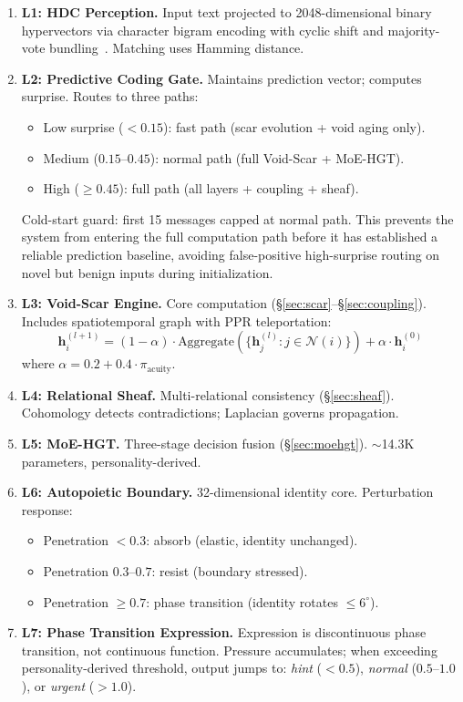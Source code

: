 \documentclass[11pt]{article}
\begin{document}
\begin{enumerate}[leftmargin=*]
\item \textbf{L1: HDC Perception.} Input text projected to 2048-dimensional binary hypervectors via character bigram encoding with cyclic shift and majority-vote bundling~\cite{kanerva2009}. Matching uses Hamming distance.

\item \textbf{L2: Predictive Coding Gate.} Maintains prediction vector; computes surprise. Routes to three paths:
\begin{itemize}
\item Low surprise ($< 0.15$): fast path (scar evolution + void aging only).
\item Medium ($0.15$--$0.45$): normal path (full Void-Scar + MoE-HGT).
\item High ($\geq 0.45$): full path (all layers + coupling + sheaf).
\end{itemize}
Cold-start guard: first 15 messages capped at normal path. This prevents the system from entering the full computation path before it has established a reliable prediction baseline, avoiding false-positive high-surprise routing on novel but benign inputs during initialization.

\item \textbf{L3: Void-Scar Engine.} Core computation (\S\ref{sec:scar}--\S\ref{sec:coupling}). Includes spatiotemporal graph with PPR teleportation:
\begin{equation}
\mathbf{h}_i^{(l+1)} = (1-\alpha) \cdot \text{Aggregate}(\{\mathbf{h}_j^{(l)} : j \in \mathcal{N}(i)\}) + \alpha \cdot \mathbf{h}_i^{(0)}
\end{equation}
where $\alpha = 0.2 + 0.4 \cdot \pi_{\text{acuity}}$.

\item \textbf{L4: Relational Sheaf.} Multi-relational consistency (\S\ref{sec:sheaf}). Cohomology detects contradictions; Laplacian governs propagation.

\item \textbf{L5: MoE-HGT.} Three-stage decision fusion (\S\ref{sec:moehgt}). $\sim$14.3K parameters, personality-derived.

\item \textbf{L6: Autopoietic Boundary.} 32-dimensional identity core. Perturbation response:
\begin{itemize}
\item Penetration $< 0.3$: absorb (elastic, identity unchanged).
\item Penetration $0.3$--$0.7$: resist (boundary stressed).
\item Penetration $\geq 0.7$: phase transition (identity rotates $\leq 6^\circ$).
\end{itemize}

\item \textbf{L7: Phase Transition Expression.} Expression is discontinuous phase transition, not continuous function. Pressure accumulates; when exceeding personality-derived threshold, output jumps to: \emph{hint} ($< 0.5$), \emph{normal} ($0.5$--$1.0$), or \emph{urgent} ($> 1.0$).
\end{enumerate}
\end{document}

